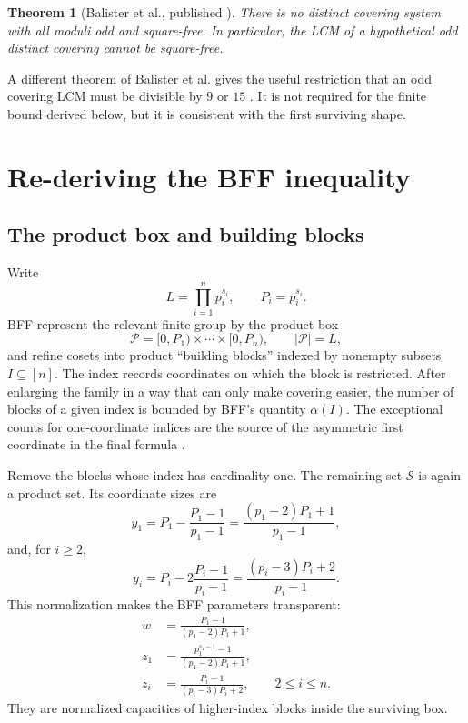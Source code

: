 \documentclass[11pt]{article}
\newtheorem{theorem}{Theorem}[section]
\theoremstyle{definition}
\begin{document}
\begin{theorem}[Balister et al., published \cite{BalisterSquarefree2021}]
There is no distinct covering system with all moduli odd and square-free.  In particular, the
LCM of a hypothetical odd distinct covering cannot be square-free.
\end{theorem}

A different theorem of Balister et al. gives the useful restriction that an odd covering LCM
must be divisible by $9$ or $15$ \cite{BalisterDensity2022}.  It is not required for the
finite bound derived below, but it is consistent with the first surviving shape.

\section{Re-deriving the BFF inequality}\label{sec:bff}

\subsection{The product box and building blocks}

Write
\[
 L=\prod_{i=1}^{n}p_i^{s_i},\qquad P_i=p_i^{s_i}.
\]
BFF represent the relevant finite group by the product box
\[
 \mathcal P=[0,P_1)\times\cdots\times[0,P_n),
 \qquad |\mathcal P|=L,
\]
and refine cosets into product ``building blocks'' indexed by nonempty subsets
$I\subseteq[n]$.  The index records coordinates on which the block is restricted.
After enlarging the family in a way that can only make covering easier, the number of
blocks of a given index is bounded by BFF's quantity $\alpha(I)$.  The exceptional counts
for one-coordinate indices are the source of the asymmetric first coordinate in the final
formula \cite{BFF1987}.

Remove the blocks whose index has cardinality one.  The remaining set $\mathcal S$ is again a
product set.  Its coordinate sizes are
\[
 y_1=P_1-\frac{P_1-1}{p_1-1}
     =\frac{(p_1-2)P_1+1}{p_1-1},
\]
and, for $i\ge2$,
\[
 y_i=P_i-2\frac{P_i-1}{p_i-1}
     =\frac{(p_i-3)P_i+2}{p_i-1}.
\]
This normalization makes the BFF parameters transparent:
\begin{align}
 w&=\frac{P_1-1}{(p_1-2)P_1+1},\\
 z_1&=\frac{p_1^{s_1-1}-1}{(p_1-2)P_1+1},\\
 z_i&=\frac{P_i-1}{(p_i-3)P_i+2},\qquad 2\le i\le n.
\end{align}
They are normalized capacities of higher-index blocks inside the surviving box.
\end{document}
